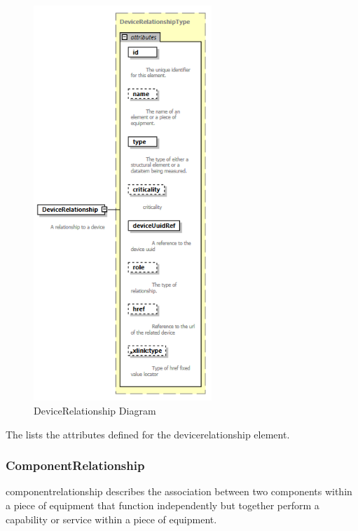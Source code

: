 \begin{figure}[ht]
  \centering
  \includegraphics[width=0.6\textwidth]{figures/devicerelationship-schema-diagram.png}
  \caption{DeviceRelationship Diagram}
  \label{fig:devicerelationship-diagram}
\end{figure}
\FloatBarrier

The  lists the attributes defined for the \gls{devicerelationship} element.





\subsubsection{ComponentRelationship}
\label{sec:ComponentRelationship}

\gls{componentrelationship} describes the association between two components within a piece of equipment that function independently but together perform a capability or service within a piece of equipment.

